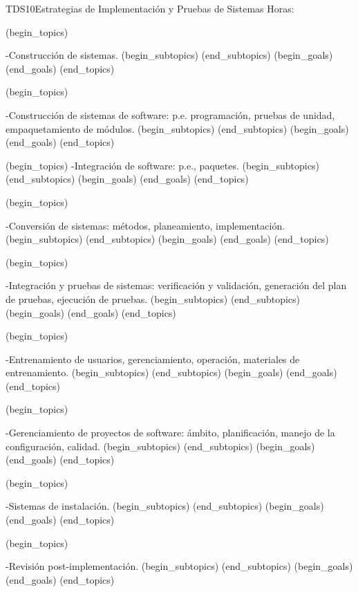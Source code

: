 \begin{BKL2}{TDS10}{Estrategias de Implementación y Pruebas de Sistemas}
Horas:
 
(begin_topics)

-Construcción de sistemas.
(begin_subtopics)
(end_subtopics)
(begin_goals)
(end_goals)
(end_topics)

 

(begin_topics)

-Construcción de sistemas de software: p.e. programación, pruebas de unidad, empaquetamiento de módulos.
(begin_subtopics)
(end_subtopics)
(begin_goals)
(end_goals)
(end_topics)

 

(begin_topics)
-Integración de software: p.e., paquetes.
(begin_subtopics)
(end_subtopics)
(begin_goals)
(end_goals)
(end_topics)

 

(begin_topics)

-Conversión de sistemas: métodos, planeamiento, implementación.
(begin_subtopics)
(end_subtopics)
(begin_goals)
(end_goals)
(end_topics)

 

(begin_topics)

-Integración y pruebas de sistemas: verificación y validación, generación del plan de pruebas, ejecución de pruebas.
(begin_subtopics)
(end_subtopics)
(begin_goals)
(end_goals)
(end_topics)

 

(begin_topics)

-Entrenamiento de usuarios, gerenciamiento, operación, materiales de entrenamiento.
(begin_subtopics)
(end_subtopics)
(begin_goals)
(end_goals)
(end_topics)

 

(begin_topics)

-Gerenciamiento de proyectos de software: ámbito, planificación, manejo de la configuración, calidad.
(begin_subtopics)
(end_subtopics)
(begin_goals)
(end_goals)
(end_topics)

 

(begin_topics)

-Sistemas de instalación.
(begin_subtopics)
(end_subtopics)
(begin_goals)
(end_goals)
(end_topics)

 

(begin_topics)

-Revisión post-implementación.
(begin_subtopics)
(end_subtopics)
(begin_goals)
(end_goals)
(end_topics)

\end{BKL2}



